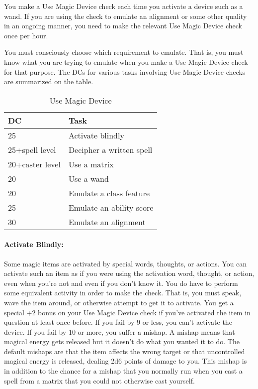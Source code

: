 You make a Use Magic Device check each time you activate a device such as a wand. If you are using the check to emulate an alignment or some other quality in an ongoing manner, you need to make the relevant Use Magic Device check once per hour.

You must consciously choose which requirement to emulate. That is, you must know what you are trying to emulate when you make a Use Magic Device check for that purpose. The DCs for various tasks involving Use Magic Device checks are summarized on the  table.
\begin{table*}
\centering
\caption{Use Magic Device}
\small
\label{tab:UseMagicDevice}
\begin{tabular}{|l|l|}
\hline
\textbf{DC}&\textbf{Task}\\
\hline
25&Activate blindly\\
25+spell level&Decipher a written spell\\
20+caster level&Use a matrix\\
20&Use a wand\\
20&Emulate a class feature\\
25&Emulate an ability score\\
30&Emulate an alignment\\
\hline
\end{tabular}
\normalsize
\end{table*}
\paragraph{Activate Blindly:}
Some magic items are activated by special words, thoughts, or actions. 
You can activate such an item as if you were using the activation word, thought, or action, even when you're not and even if you don't know it.
You do have to perform some equivalent activity in order to make the check. 
That is, you must speak, wave the item around, or otherwise attempt to get it to activate. 
You get a special +2 bonus on your Use Magic Device check if you've activated the item in question at least once before. 
If you fail by 9 or less, you can't activate the device. If you fail by 10 or more, you suffer a mishap. 
A mishap means that magical energy gets released but it doesn't do what you wanted it to do. 
The default mishaps are that the item affects the wrong target or that uncontrolled magical energy is released, dealing 2d6 points of damage to you. 
This mishap is in addition to the chance for a mishap that you normally run when you cast a spell from a matrix that you could not otherwise cast yourself.

